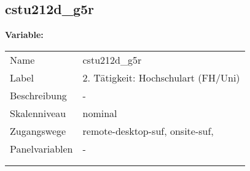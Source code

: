 	
	
	\subsection{cstu212d\_g5r}
	\label{subSection:cstu212d_g5r}

	\noindent\textbf{Variable:}\\
		\begin{tabular}{lL{11.3cm}}
			\label{tableVariable:cstu212d_g5r}
			Name & cstu212d\_g5r \\
			Label & 2. Tätigkeit: Hochschulart (FH/Uni) \\
			Beschreibung & - \\
			Skalenniveau & nominal \\
			Zugangswege &
				remote-desktop-suf,
				onsite-suf,
 \\
			Panelvariablen & -
			 \\
			 \\
 \\
		\end{tabular}






